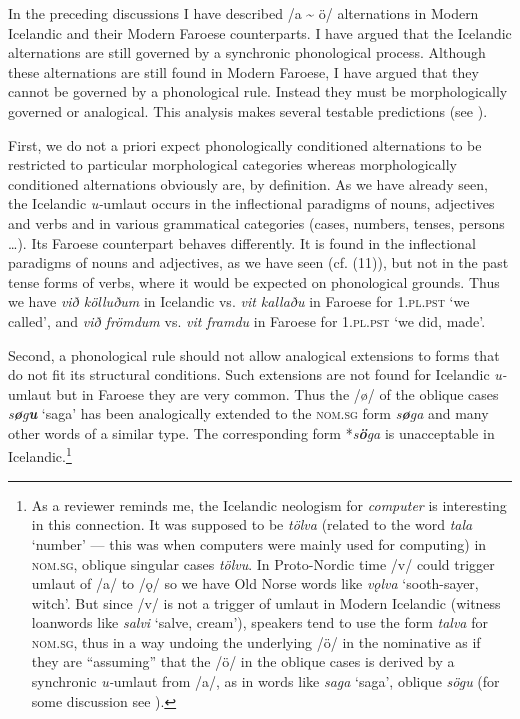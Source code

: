 \documentclass[output=paper,
modfonts
]{LSP/langsci}
\begin{document}
\begin{exe}
In the preceding discussions I have described /a
\textasciitilde{} ö/ alternations in Modern Icelandic and their Modern
Faroese counterparts. I have argued that the Icelandic alternations are
still governed by a synchronic phonological process. Although these
alternations are still found in Modern Faroese, I have argued that they
cannot be governed by a phonological rule. Instead they must be
morphologically governed or analogical. This analysis makes several
testable predictions (see \citealt[100--102]{thrainsson2011}).

First, we do not a priori expect phonologically
conditioned alternations to be restricted to particular morphological
categories whereas morphologically conditioned alternations obviously
are, by definition. As we have already seen, the Icelandic
\emph{u-}umlaut occurs in the inflectional paradigms of nouns,
adjectives and verbs and in various grammatical categories (cases,
numbers, tenses, persons \ldots{}). Its Faroese counterpart behaves
differently. It is found in the inflectional paradigms of nouns and
adjectives, as we have seen (cf. (11)), but not in the past tense forms
of verbs, where it would be expected on phonological grounds. Thus we
have \emph{við kölluðum} in Icelandic vs. \emph{vit kallaðu} in Faroese
for \textsc{1.pl.pst} `we called', and \emph{við frömdum} vs. \emph{vit
framdu} in Faroese for \textsc{1.pl.pst} `we did,
made'.

Second, a phonological rule should not allow analogical extensions to
forms that do not fit its structural conditions. Such extensions are not
found for Icelandic \emph{u-}umlaut but in Faroese they are very common.
Thus the /ø/ of the oblique cases \emph{s\textbf{ø}g\textbf{u}} `saga'
has been analogically extended to the \textsc{nom.sg} form
\emph{s\textbf{ø}ga} and many other words of a similar type. The
corresponding form *\emph{s\textbf{ö}ga} is unacceptable in
Icelandic.\footnote{As a reviewer reminds me, the Icelandic neologism
  for \emph{computer} is interesting in this connection. It was supposed
  to be \emph{tölva} (related to the word \emph{tala} `number' --- this
  was when computers were mainly used for computing) in \textsc{nom.sg},
  oblique singular cases \emph{tölvu}. In Proto-Nordic time /v/ could
  trigger umlaut of /a/ to /ǫ/ so we have Old Norse words like
  \emph{vǫlva} `sooth-sayer, witch'. But since /v/ is not a trigger of
  umlaut in Modern Icelandic (witness loanwords like \emph{salvi}
  `salve, cream'), speakers tend to use the form \emph{talva} for
  \textsc{nom.sg}, thus in a way undoing the underlying /ö/ in the
  nominative as if they are ``assuming'' that the /ö/ in the oblique
  cases is derived by a synchronic \emph{u-}umlaut from /a/, as in words
  like \emph{saga} `saga', oblique \emph{sögu} (for some discussion see
\citealt{thrainsson1982}).}


\end{exe}
\end{document}
